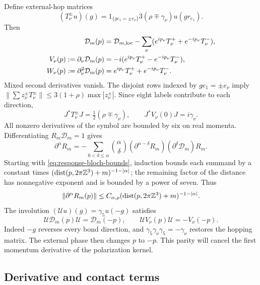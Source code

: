 Define external-hop matrices
\[
 (T_\nu^\pm u)(g)=1_{\{ge_1=\pm e_\nu\}}
                          3(\rho\mp\gamma_\nu)u(gr_{e_1}).
\]
Then
\begin{align}\label{eq:response-symbol-vertices}
 \mathcal D_m(p)&=\mathcal D_{m,\mathrm{loc}}
       -\sum_\nu(e^{ip_\nu}T_\nu^++e^{-ip_\nu}T_\nu^-),\notag\\
 V_\nu(p):=\partial_\nu\mathcal D_m(p)
       &=-i(e^{ip_\nu}T_\nu^+-e^{-ip_\nu}T_\nu^-),\notag\\
 W_\nu(p):=\partial_\nu^2\mathcal D_m(p)
       &=e^{ip_\nu}T_\nu^++e^{-ip_\nu}T_\nu^-.
\end{align}
Mixed second derivatives vanish. The disjoint rows indexed
by $ge_1=\pm e_\nu$ imply
$\|\sum z_\nu^\pm T_\nu^\pm\|\le3(1+\rho)\max|z_\nu^\pm|$.
Since eight labels contribute to each direction,
\begin{equation}\label{eq:response-light-vertex}
 J^*T_\nu^\pm J=\tfrac12(\rho\mp\gamma_\nu),\qquad
 J^*V_\nu(0)J=i\gamma_\nu.
\end{equation}
All nonzero derivatives of the symbol are bounded by six
on real momenta. Differentiating $R_m\mathcal D_m=1$ gives
\[
 \partial^\alpha R_m=-\sum_{0<\delta\le\alpha}
   \binom\alpha\delta(\partial^{\alpha-\delta}R_m)
                    (\partial^\delta\mathcal D_m)R_m.
\]
Starting with \eqref{eq:response-bloch-bounds}, induction bounds
each summand by a constant times
$(\operatorname{dist}(p,2\pi\mathbb Z^3)+m)^{-1-|\alpha|}$;
the remaining factor of the distance has nonnegative exponent
and is bounded by a power of seven. Thus
\begin{equation}\label{eq:response-inverse-derivatives}
 \|\partial^\alpha R_m(p)\|
   \le C_{\alpha,\rho}
       (\operatorname{dist}(p,2\pi\mathbb Z^3)+m)^{-1-|\alpha|}.
\end{equation}
The involution $(\mathcal Uu)(g)=\gamma_5u(-g)$ satisfies
\begin{equation}\label{eq:response-bloch-parity}
 \mathcal U\mathcal D_m(p)\mathcal U=\mathcal D_m(-p),\qquad
 \mathcal UV_\nu(p)\mathcal U=-V_\nu(-p).
\end{equation}
Indeed $-g$ reverses every bond direction, and
$\gamma_5\gamma_\nu\gamma_5=-\gamma_\nu$ restores the
hopping matrix. The external phase then changes $p$ to
$-p$. This parity will cancel the first momentum derivative
of the polarization kernel.

\subsection{Derivative and contact terms}\label{subsec:response-contact}

